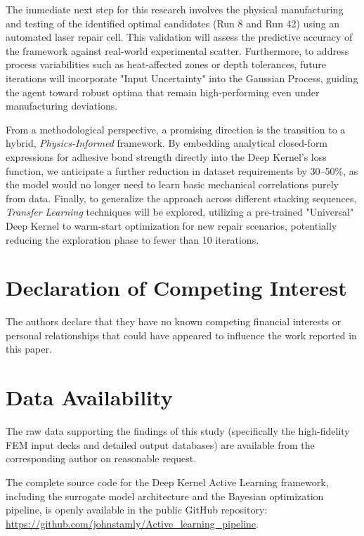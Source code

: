\documentclass[
  preprint,
  12pt,
  a4paper
]{elsarticle}
\begin{document}
The immediate next step for this research involves the physical manufacturing and testing of the identified optimal candidates (Run 8 and Run 42) using an automated laser repair cell. This validation will assess the predictive accuracy of the framework against real-world experimental scatter. Furthermore, to address process variabilities such as heat-affected zones or depth tolerances, future iterations will incorporate "Input Uncertainty" into the Gaussian Process, guiding the agent toward robust optima that remain high-performing even under manufacturing deviations.

From a methodological perspective, a promising direction is the transition to a hybrid, \textit{Physics-Informed} framework. By embedding analytical closed-form expressions for adhesive bond strength \cite{psarras2024design} directly into the Deep Kernel's loss function, we anticipate a further reduction in dataset requirements by 30--50\%, as the model would no longer need to learn basic mechanical correlations purely from data. Finally, to generalize the approach across different stacking sequences, \textit{Transfer Learning} techniques will be explored, utilizing a pre-trained "Universal" Deep Kernel to warm-start optimization for new repair scenarios, potentially reducing the exploration phase to fewer than 10 iterations.





\section*{Declaration of Competing Interest}
The authors declare that they have no known competing financial interests or personal relationships that could have appeared to influence the work reported in this paper.

\section*{Data Availability}
The raw data supporting the findings of this study (specifically the high-fidelity FEM input decks and detailed output databases) are available from the corresponding author on reasonable request. 

The complete source code for the Deep Kernel Active Learning framework, including the surrogate model architecture and the Bayesian optimization pipeline, is openly available in the public GitHub repository: \url{https://github.com/johnstamly/Active_learning_pipeline}.
\end{document}
